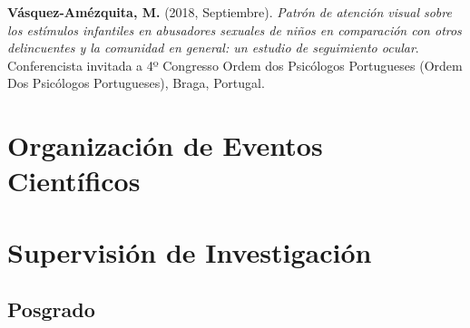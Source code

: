 \documentclass[11pt,a4paper,]{awesome-cv}
\begin{document}
\textbf{Vásquez-Amézquita, M.} (2018, Septiembre). \emph{Patrón de
atención visual sobre los estímulos infantiles en abusadores sexuales de
niños en comparación con otros delincuentes y la comunidad en general:
un estudio de seguimiento ocular}. Conferencista invitada a 4º Congresso
Ordem dos Psicólogos Portugueses (Ordem Dos Psicólogos Portugueses),
Braga, Portugal.

\endgroup

\section{Organización de Eventos
Científicos}\label{organizaciuxf3n-de-eventos-cientuxedficos}

\begin{cventries}
\end{cventries}

\section{Supervisión de
Investigación}\label{supervisiuxf3n-de-investigaciuxf3n}

\subsection{\texorpdfstring{\textbf{Posgrado}}{}}\label{section-2}
\end{document}
